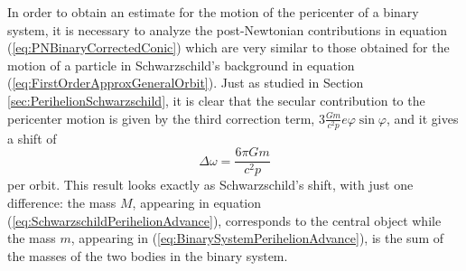 In order to obtain an estimate for the motion of the pericenter of a binary system, it is necessary to analyze the post-Newtonian contributions in equation (\ref{eq:PNBinaryCorrectedConic}) which are very similar to those obtained for the motion of a particle in Schwarzschild's background in equation (\ref{eq:FirstOrderApproxGeneralOrbit}). Just as studied in Section \ref{sec:PerihelionSchwarzschild}, it is clear that the secular contribution to the pericenter motion is given by the third correction term, $ 3 \frac{Gm}{c^2 p} e \varphi \sin \varphi $, and it gives a shift of
\begin{equation}
\Delta \omega =  \frac{6 \pi Gm}{c^2 p} \label{eq:BinarySystemPerihelionAdvance}
\end{equation} 
per orbit. This result looks exactly as Schwarzschild's shift, with just one difference: the mass $M$, appearing in equation (\ref{eq:SchwarzschildPerihelionAdvance}), corresponds to the central object while the mass $m$, appearing in (\ref{eq:BinarySystemPerihelionAdvance}), is the sum of the masses of the two bodies in the binary system.
